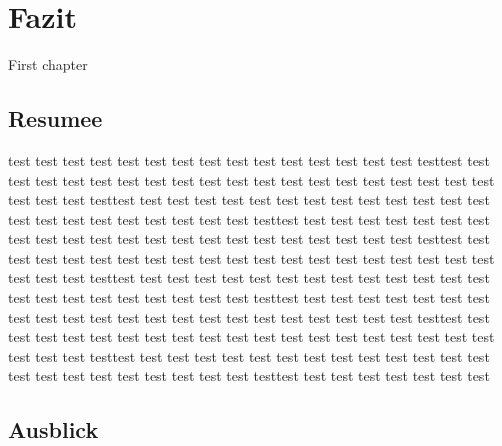 %
% 

\chapter{Fazit}

First chapter


\section{Resumee}
test test test test test test test test test test test test test test test testtest test test test test test test test
test test test test test test test test test test test test test test test testtest test test test test test test test
test test test test test test test test test test test test test test test testtest test test test test test test test
test test test test test test test test test test test test test test test testtest test test test test test test test
test test test test test test test test test test test test test test test testtest test test test test test test test
test test test test test test test test test test test test test test test testtest test test test test test test test
test test test test test test test test test test test test test test test testtest test test test test test test test
test test test test test test test test test test test test test test test testtest test test test test test test test
test test test test test test test test test test test test test test test testtest test test test test test test test

\section{Ausblick}

